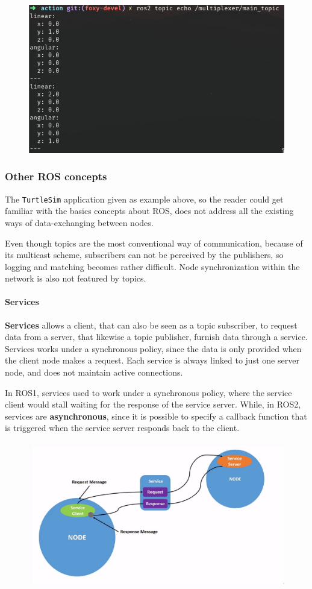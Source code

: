 \begin{figure}[H]
        \centering
        \includegraphics[width=0.5\linewidth]{images/ts_main_topicinfo.png}
\end{figure}

\subsubsection{Other ROS concepts}

The \texttt{TurtleSim} application given as example above, so the reader could get familiar with the basics concepts about ROS, does not address all the existing ways of data-exchanging between nodes.
                
Even though topics are the most conventional way of communication, because of its multicast scheme, subscribers can not be perceived by the publishers, so logging and matching becomes rather difficult. Node synchronization within the network is also not featured by topics.

\paragraph{Services}

\textbf{Services} allows a client, that can also be seen as a topic subscriber, to request data from a server, that likewise a topic publisher, furnish data through a service. Services works under a synchronous policy, since the data is only provided when the client node makes a request. Each service is always linked to just one server node, and does not maintain active connections.
                
In ROS1, services used to work under a synchronous policy, where the service client would stall waiting for the response of the service server. While, in ROS2, services are \textbf{asynchronous}, since it is possible to specify a callback function that is triggered when the service server responds back to the client.

\begin{figure}[H]
    \centering
    \includegraphics[width=0.7\linewidth]{images/ros2-services.png}
\end{figure}
                
